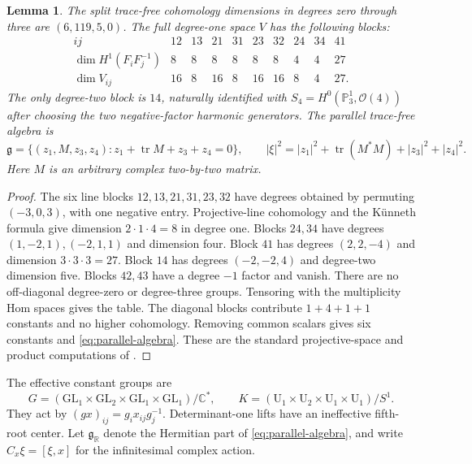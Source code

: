 \documentclass[11pt]{amsart}
\newtheorem{lemma}[theorem]{Lemma}
\theoremstyle{definition}
\theoremstyle{remark}
\newcommand{\CC}{\mathbb C}
\newcommand{\RR}{\mathbb R}
\newcommand{\PP}{\mathbb P}
\newcommand{\cO}{\mathcal O}
\newcommand{\tr}{\operatorname{tr}}
\begin{document}
\begin{lemma}\label{lem:cohomology}
The split trace-free cohomology dimensions in degrees zero through three
are $(6,119,5,0)$. The full degree-one space $V$ has the following blocks:
\[
\begin{array}{c|rrrrrrrrr}
ij&12&13&21&31&23&32&24&34&41\\\hline
\dim H^1(F_iF_j^{-1})&8&8&8&8&8&8&4&4&27\\
\dim V_{ij}&16&8&16&8&16&16&8&4&27.
\end{array}
\]
The only degree-two block is $14$, naturally identified with
$S_4=H^0(\PP^1_3,\cO(4))$ after choosing the two negative-factor
harmonic generators. The parallel trace-free algebra is
\begin{equation}\label{eq:parallel-algebra}
 \mathfrak g=\{(z_1,M,z_3,z_4):z_1+\tr M+z_3+z_4=0\},\qquad
 |\xi|^2=|z_1|^2+\tr(M^*M)+|z_3|^2+|z_4|^2.
\end{equation}
Here $M$ is an arbitrary complex two-by-two matrix.
\end{lemma}
\begin{proof}
The six line blocks $12,13,21,31,23,32$ have degrees obtained by
permuting $(-3,0,3)$, with one negative entry. Projective-line cohomology
and the K\"unneth formula give dimension $2\cdot1\cdot4=8$ in
degree one. Blocks $24,34$ have degrees $(1,-2,1),(-2,1,1)$ and
dimension four. Block $41$ has degrees $(2,2,-4)$ and dimension
$3\cdot3\cdot3=27$. Block $14$ has degrees $(-2,-2,4)$ and
degree-two dimension five. Blocks $42,43$ have a degree $-1$ factor
and vanish. There are no off-diagonal degree-zero or degree-three
groups. Tensoring with the multiplicity Hom spaces gives the table.
The diagonal blocks contribute $1+4+1+1$ constants and no higher
cohomology. Removing common scalars gives six constants and
\eqref{eq:parallel-algebra}. These are the standard projective-space
and product computations of \cite[Tags 01XT and 0BED]{stacks}.
\end{proof}

The effective constant groups are
\[
 G=(\mathrm{GL}_1\times\mathrm{GL}_2\times\mathrm{GL}_1
                 \times\mathrm{GL}_1)/\CC^*,\qquad
 K=(\mathrm U_1\times\mathrm U_2\times\mathrm U_1\times\mathrm U_1)/S^1.
\]
They act by $(gx)_{ij}=g_ix_{ij}g_j^{-1}$. Determinant-one lifts have
an ineffective fifth-root center. Let $\mathfrak g_{\RR}$ denote the
Hermitian part of \eqref{eq:parallel-algebra}, and write
$C_x\xi=[\xi,x]$ for the infinitesimal complex action.
\end{document}
